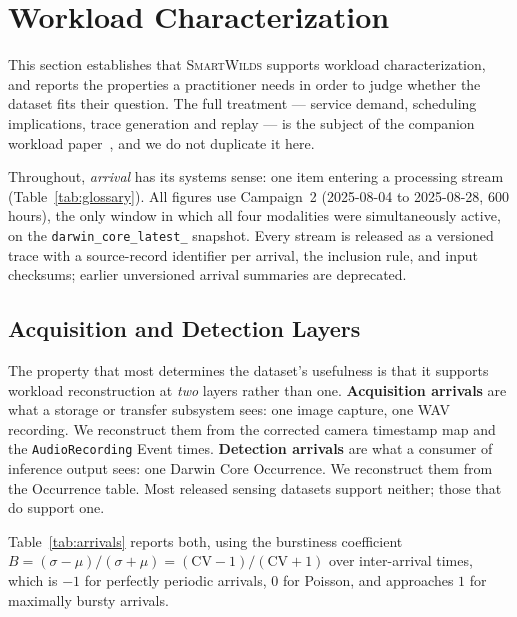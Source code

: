\documentclass[sigconf]{acmart}
\newcommand{\smartwilds}{\textsc{SmartWilds}\xspace}
\begin{document}
\section{Workload Characterization}
\label{sec:characterization}

This section establishes that \smartwilds supports workload
characterization, and reports the properties a practitioner needs in
order to judge whether the dataset fits their question. The full
treatment --- service demand, scheduling implications, trace generation
and replay --- is the subject of the companion workload
paper~\cite{smartwilds_workload}, and we do not duplicate it here.

Throughout, \emph{arrival} has its systems sense: one item entering a
processing stream (Table~\ref{tab:glossary}). All figures use Campaign~2
(2025-08-04 to 2025-08-28, 600 hours), the only window in which all four
modalities were simultaneously active, on the
\texttt{darwin\_core\_\allowbreak latest\_} snapshot. Every stream is released as a
versioned trace with a source-record identifier per arrival, the
inclusion rule, and input checksums; earlier unversioned arrival
summaries are deprecated.

\subsection{Acquisition and Detection Layers}

The property that most determines the dataset's usefulness is that it
supports workload reconstruction at \emph{two} layers rather than one.
\textbf{Acquisition arrivals} are what a storage or transfer subsystem
sees: one image capture, one WAV recording. We reconstruct them from the
corrected camera timestamp map and the \texttt{AudioRecording} Event
times. \textbf{Detection arrivals} are what a consumer of inference
output sees: one Darwin Core Occurrence. We reconstruct them from the
Occurrence table. Most released sensing datasets support neither; those
that do support one.

Table~\ref{tab:arrivals} reports both, using the burstiness coefficient
$B = (\sigma-\mu)/(\sigma+\mu) = (\mathrm{CV}-1)/(\mathrm{CV}+1)$ over
inter-arrival times, which is $-1$ for perfectly periodic arrivals, $0$
for Poisson, and approaches $1$ for maximally bursty arrivals.
\end{document}
